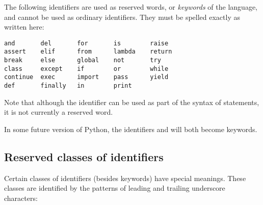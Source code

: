The following identifiers are used as reserved words, or
\emph{keywords} of the language, and cannot be used as ordinary
identifiers.  They must be spelled exactly as written here:%
%

\begin{verbatim}
and       del       for       is        raise    
assert    elif      from      lambda    return   
break     else      global    not       try      
class     except    if        or        while    
continue  exec      import    pass      yield    
def       finally   in        print              
\end{verbatim}


Note that although the identifier  can be used as part of the
syntax of  statements, it is not currently a reserved
word.

In some future version of Python, the identifiers  and
 will both become keywords.


\subsection{Reserved classes of identifiers\label{id-classes}}

Certain classes of identifiers (besides keywords) have special
meanings.  These classes are identified by the patterns of leading and
trailing underscore characters:

